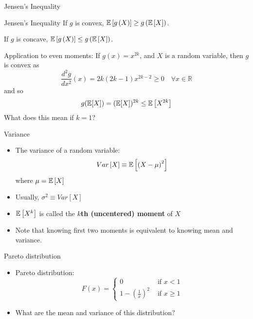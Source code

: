 \begin{frame}{Jensen's Inequality}
\begin{center}
\begin{minipage}{.8\textwidth}
\begin{block}{Jensen's Inequality}
If $g$ is convex, $\mathbb{E}\left[g\left(X\right)\right] \ge g\left(\mathbb{E}\left[X\right]\right)$.

\medskip
If $g$ is concave, $\mathbb{E}\left[g\left(X\right)\right] \le g\left(\mathbb{E}\left[X\right]\right)$.
\end{block}
\end{minipage}
\end{center}
\vspace{0.2cm}
\pause
Application to even moments:
If $g(x)=x^{2 k}$, and $X$ is a random variable, then $g$ is convex as
$$
\frac{d^2 g}{d x^2}(x)=2 k(2 k-1) x^{2 k-2} \geq 0 \quad \forall x \in \mathbb{R}
$$
and so
$$
g(\mathbb{E}[X])=(\mathbb{E}[X])^{2 k} \leq \mathbb{E}\left[X^{2 k}\right]
$$
What does this mean if $k=1$?
\end{frame}


\begin{frame}{Variance}
\begin{itemize}
	\item The variance of a random variable:\[
		Var \left[X\right] \equiv \mathbb{E}\left[\left(X-\mu\right)^2\right]
	\]
	where $\mu=\mathbb{E}\left[X\right]$
	
	\bigskip
	\item Usually, $\sigma^2 \equiv Var \left[X\right] $


	\bigskip
	\item $\mathbb{E}\left[X^k\right]$ is called the {\bf $k$th (uncentered) moment} of $X$
	
	\bigskip
	\item Note that knowing first two moments is equivalent to knowing mean and variance. 
	
\end{itemize}
\end{frame}


\begin{frame}{Pareto distribution}
\begin{itemize}
	\item Pareto distribution:\[
	F\left(x\right)=\begin{cases}
	0 & \text{ if }x<1\\
	1-\left(\frac{1}{x}\right)^{2} & \text{ if }x\ge1
	\end{cases}
	\]

	\medskip
	\item What are the mean and variance of this distribution?
	
\end{itemize}
\end{frame}



